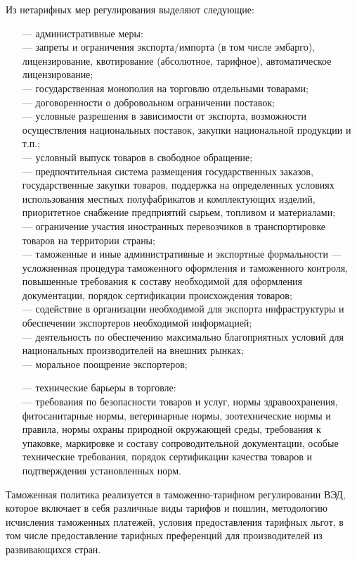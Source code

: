 Из нетарифных мер регулирования выделяют следующие:
\begin{enumerate}
	\item [---] административные меры:\\
	--- запреты и ограничения экспорта/импорта (в том числе эмбарго), лицензирование, квотирование (абсолютное, тарифное), автоматическое лицензирование;\\
	--- государственная монополия на торговлю отдельными товарами;\\
	--- договоренности о добровольном ограничении поставок;\\
	--- условные разрешения в зависимости от экспорта, возможности осуществления национальных поставок, закупки национальной продукции и т.п.;\\
	--- условный выпуск товаров  в свободное обращение;\\
	--- предпочтительная система размещения государственных заказов, государственные закупки товаров, поддержка на определенных условиях использования местных полуфабрикатов и комплектующих изделий, приоритетное снабжение предприятий сырьем, топливом и материалами;\\
	--- ограничение участия иностранных перевозчиков в транспортировке товаров на территории страны;\\
	--- таможенные и иные административные и экспортные формальности --- усложненная процедура таможенного оформления и таможенного контроля, повышенные требования к составу необходимой для оформления документации, порядок сертификации происхождения товаров;\\
	--- содействие в организации необходимой для экспорта инфраструктуры и обеспечении экспортеров необходимой информацией;\\
	--- деятельность по обеспечению максимально благоприятных условий для национальных производителей на внешних рынках;\\
	---  моральное поощрение экспортеров;
	\item [---] технические барьеры в торговле:\\
	--- требования по безопасности товаров  и услуг, нормы здравоохранения, фитосанитарные нормы, ветеринарные нормы, зоотехнические нормы и правила, нормы охраны природной окружающей среды, требования к упаковке, маркировке и составу сопроводительной документации, особые технические требования, порядок сертификации качества товаров и подтверждения установленных норм.
\end{enumerate}

Таможенная политика реализуется в таможенно-тарифном регулировании ВЭД, которое включает в себя различные виды тарифов и пошлин, методологию исчисления таможенных платежей, условия предоставления тарифных льгот, в том числе предоставление тарифных преференций для производителей из развивающихся стран.







